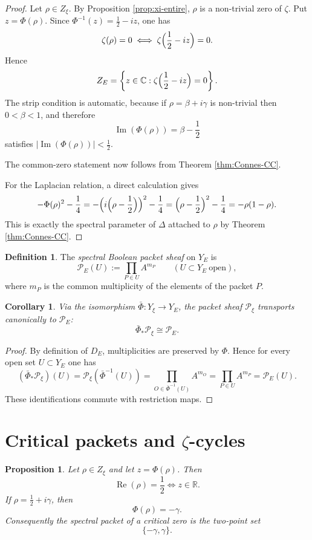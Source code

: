 \documentclass[11pt,a4paper]{article}
\newtheorem{proposition}[theorem]{Proposition}
\newtheorem{corollary}[theorem]{Corollary}
\theoremstyle{definition}
\newtheorem{definition}[theorem]{Definition}
\theoremstyle{remark}
\DeclareMathOperator{\Rea}{Re}
\DeclareMathOperator{\Ima}{Im}
\newcommand{\RR}{\mathbb R}
\newcommand{\CC}{\mathbb C}
\newcommand{\cP}{\mathcal P}
\begin{document}
\begin{proof}
Let $\rho\in Z_\xi$.  By Proposition \ref{prop:xi-entire}, $\rho$ is a non-trivial zero of $\zeta$.  Put $z=\Phi(\rho)$.  Since $\Phi^{-1}(z)=\frac12-iz$, one has
\[
\zeta(\rho)=0
\iff
\zeta\Bigl(\frac12-iz\Bigr)=0.
\]
Hence
\[
Z_E=\left\{z\in\CC:\zeta\Bigl(\frac12-iz\Bigr)=0\right\}.
\]
The strip condition is automatic, because if $\rho=\beta+i\gamma$ is non-trivial then $0<\beta<1$, and therefore
\[
\Ima(\Phi(\rho))=\beta-\frac12
\]
satisfies $|\Ima(\Phi(\rho))|<\frac12$.

The common-zero statement now follows from Theorem \ref{thm:Connes-CC}.

For the Laplacian relation, a direct calculation gives
\[
-\Phi(\rho)^2-\frac14
=-\Bigl(i\Bigl(\rho-\frac12\Bigr)\Bigr)^2-\frac14
=\Bigl(\rho-\frac12\Bigr)^2-\frac14
=-\rho(1-\rho).
\]
This is exactly the spectral parameter of $\Delta$ attached to $\rho$ by Theorem \ref{thm:Connes-CC}.
\end{proof}

\begin{definition}
The \emph{spectral Boolean packet sheaf} on $Y_E$ is
\[
\cP_E(U):=\prod_{P\in U} A^{m_P}
\qquad (U\subset Y_E\ \text{open}),
\]
where $m_P$ is the common multiplicity of the elements of the packet $P$.
\end{definition}

\begin{corollary}\label{cor:packet-transport}
Via the isomorphism $\bar\Phi:Y_\xi\to Y_E$, the packet sheaf $\cP_\xi$ transports canonically to $\cP_E$:
\[
\bar\Phi_*\cP_\xi\cong \cP_E.
\]
\end{corollary}

\begin{proof}
By definition of $D_E$, multiplicities are preserved by $\Phi$.  Hence for every open set $U\subset Y_E$ one has
\[
(\bar\Phi_*\cP_\xi)(U)=\cP_\xi(\bar\Phi^{-1}(U))
=\prod_{O\in \bar\Phi^{-1}(U)} A^{m_O}
=\prod_{P\in U} A^{m_P}
=\cP_E(U).
\]
These identifications commute with restriction maps.
\end{proof}

\section{Critical packets and $\zeta$-cycles}

\begin{proposition}\label{prop:critical-real}
Let $\rho\in Z_\xi$ and let $z=\Phi(\rho)$.  Then
\[
\Rea(\rho)=\frac12
\iff
z\in\RR.
\]
If $\rho=\frac12+i\gamma$, then
\[
\Phi(\rho)=-\gamma.
\]
Consequently the spectral packet of a critical zero is the two-point set
\[
\{-\gamma,\gamma\}.
\]
\end{proposition}
\end{document}
